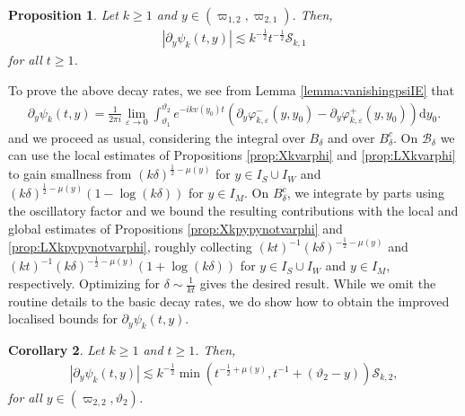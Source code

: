 \documentclass[11pt,reqno]{amsproc}
\newtheorem{proposition}{Proposition}[section]
\newtheorem{corollary}[proposition]{Corollary}
\theoremstyle{definition}
\numberwithin{equation}{section}
\newcommand{\B}{{\mathcal{B}}}
\newcommand{\cS}{{\mathcal S}}
\renewcommand{\d}{\mathrm{d}}
\newcommand{\ep}{\varepsilon}
\begin{document}
\begin{proposition}\label{prop:IDpypsistrong}
Let $k\geq 1$ and $y\in (\varpi_{1,2}, \varpi_{2,1})$. Then,
\begin{align*}
\left| \partial_y\psi_k(t,y) \right| \lesssim k^{-\frac12} t^{-\frac12}\cS_{k,1}
\end{align*} 
for all $t\geq 1$.
\end{proposition}

To prove the above decay rates, we see from Lemma \ref{lemma:vanishingpsiIE} that
\begin{align*}
\partial_y\psi_k(t,y) = \frac{1}{2\pi i} \lim_{\ep\rightarrow 0} \int_{\vartheta_1}^{\vartheta_2} e^{-ikv(y_0)t}\left( \partial_y\varphi_{k,\ep}^-(y,y_0) - \partial_y\varphi_{k,\ep}^+(y,y_0) \right)  \d y_0.
\end{align*}
and we proceed as usual, considering the integral over $B_\delta$ and over $B_\delta^c$. On $\B_\delta$ we can use the local estimates of Propositions \ref{prop:Xkvarphi} and \ref{prop:LXkvarphi} to gain smallness from $(k\delta)^{\frac12-\mu(y)}$  for $y\in I_S\cup I_W$ and $(k\delta)^{\frac12-\mu(y)}\left( 1 - \log(k\delta)\right)$ for $y\in I_M$. On $B_{\delta}^c$, we integrate by parts using the oscillatory factor and we bound the resulting contributions with the local and global estimates of Propositions \ref{prop:Xkpypynotvarphi} and \ref{prop:LXkpypynotvarphi}, roughly collecting $(kt)^{-1}(k\delta)^{-\frac12-\mu(y)}$ and $(kt)^{-1}(k\delta)^{-\frac12-\mu(y)}\left( 1 + \log(k\delta)\right)$ for $y\in I_S\cup I_W$ and $y\in I_M$, respectively. Optimizing for $\delta\sim \frac{1}{kt}$ gives the desired result. While we omit the routine details to the basic decay rates, we do show how to obtain the improved localised bounds for $\partial_y\psi_k(t,y)$.

\begin{corollary}\label{cor:improvedIDpypsiweak}
Let $k\geq 1$ and $t\geq 1$. Then,
\begin{align*}
\left| \partial_y \psi_k(t,y) \right| \lesssim k^{-\frac12} \min \left( t^{-\frac12+\mu(y)}, t^{-1} + (\vartheta_2-y) \right) \cS_{k,2},
\end{align*}
for all $y\in(\varpi_{2,2},\vartheta_2)$.
\end{corollary}
\end{document}
